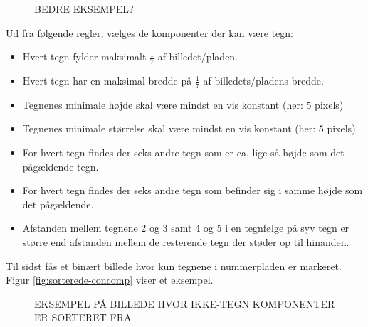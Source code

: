 \begin{figure}[htp]
  \centering
  \caption{BEDRE EKSEMPEL?}
  \label{fig:concomp}
\end{figure}

Ud fra følgende regler, vælges de komponenter der kan være tegn:

\begin{itemize}
\item Hvert tegn fylder maksimalt $\frac{1}{7}$ af billedet/pladen.
\item Hvert tegn har en maksimal bredde på $\frac{1}{7}$ af billedets/pladens bredde.
\item Tegnenes minimale højde skal være mindst en vis konstant (her: 5 pixels)
\item Tegnenes minimale størrelse skal være mindst en vis konstant (her: 5 pixels)
\item For hvert tegn findes der seks andre tegn som er ca. lige så højde som det pågældende tegn.
\item For hvert tegn findes der seks andre tegn som befinder sig i samme højde som det pågældende.
\item Afstanden mellem tegnene 2 og 3 samt 4 og 5 i en tegnfølge på syv tegn er større end afstanden mellem de resterende tegn der støder op til hinanden.
\end{itemize}



Til sidst fås et binært billede hvor kun tegnene i nummerpladen er markeret. Figur \vref{fig:sorterede-concomp} viser et eksempel.


\begin{figure}[htp]
  \centering
  \caption{EKSEMPEL PÅ BILLEDE HVOR IKKE-TEGN KOMPONENTER ER SORTERET FRA}
  \label{fig:sorterede-concomp}
\end{figure}

